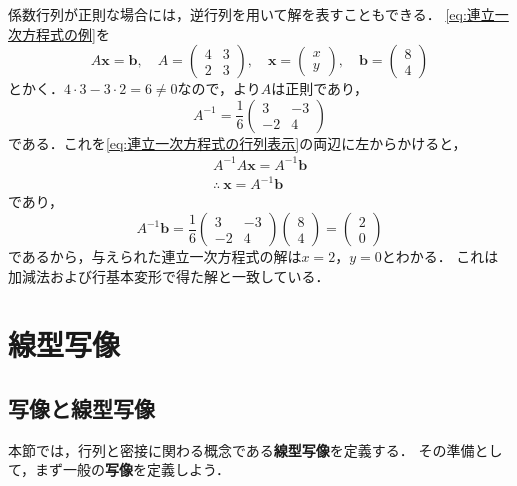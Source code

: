係数行列が正則な場合には，逆行列を用いて解を表すこともできる．
\eqref{eq:連立一次方程式の例}を
\begin{equation}
  A\bm{x} = \bm{b}, \quad
  A = \begin{pmatrix} 4 & 3 \\ 2 & 3 \end{pmatrix}, \quad
  \bm{x} = \begin{pmatrix} x \\ y \end{pmatrix}, \quad
  \bm{b} = \begin{pmatrix} 8 \\ 4 \end{pmatrix} \label{eq:連立一次方程式の行列表示}
\end{equation}
とかく．$4 \cdot 3 - 3 \cdot 2 = 6 \ne 0$なので，より$A$は正則であり，
\[
  A^{-1} = \frac{1}{6} \begin{pmatrix} 3 & -3 \\ -2 & 4 \end{pmatrix}
\]
である．これを\eqref{eq:連立一次方程式の行列表示}の両辺に左からかけると，
\begin{gather*}
  A^{-1}A\bm{x} = A^{-1}\bm{b} \\
  \therefore~ \bm{x} = A^{-1}\bm{b}
\end{gather*}
であり，
\[
  A^{-1}\bm{b} = \frac{1}{6}
  \begin{pmatrix} 3 & -3 \\ -2 & 4 \end{pmatrix}
  \begin{pmatrix} 8 \\ 4 \end{pmatrix}
  =
  \begin{pmatrix} 2 \\ 0 \end{pmatrix}
\]
であるから，与えられた連立一次方程式の解は$x = 2$，$y = 0$とわかる．
これは加減法および行基本変形で得た解と一致している．

\section{線型写像}

\subsection{写像と線型写像}

本節では，行列と密接に関わる概念である\textbf{線型写像}を定義する．
その準備として，まず一般の\textbf{写像}を定義しよう．

